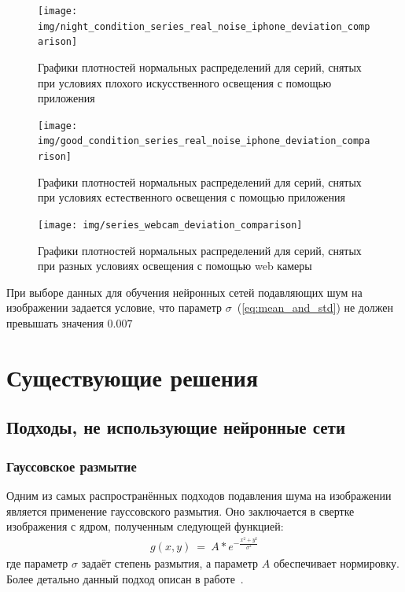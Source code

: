 \begin{figure}[H]
	\centering
	\texttt{[image: img/night\_condition\_series\_real\_noise\_iphone\_deviation\_comparison]}
	\caption{Графики плотностей нормальных распределений для серий, снятых при условиях плохого искусственного освещения с помощью приложения~\autocite{RAWCamera}}
	\label{fig:distribuion_real_noise}
\end{figure}


\begin{figure}[H]
	\centering
	\texttt{[image: img/good\_condition\_series\_real\_noise\_iphone\_deviation\_comparison]}
	\caption{Графики плотностей нормальных распределений для серий, снятых при условиях естественного освещения с помощью приложения~\autocite{RAWCamera}}
	\label{fig:distribuion_real_noise_good_condition}
\end{figure}

\begin{figure}[H]
	\centering
	\texttt{[image: img/series\_webcam\_deviation\_comparison]}
	\caption{Графики плотностей нормальных распределений для серий, снятых при разных условиях освещения с помощью web камеры~\autocite{WebCam}}
	\label{fig:distribuion_webcam}
\end{figure}


При выборе данных для обучения нейронных сетей подавляющих шум на изображении задается условие, что параметр $\sigma$~(\ref{eq:mean_and_std}) не должен превышать значения $0.007$

\section{Существующие решения}
\subsection{Подходы, не использующие нейронные сети}

\subsubsection{Гауссовское размытие}
Одним из самых распространённых подходов подавления шума на изображении является применение гауссовского размытия. Оно заключается в свертке изображения с ядром, полученным следующей функцией:
\begin{eqnarray}\label{eq:gauss_kernel_function}
g(x, y)\ =\ A \ast e^{-\frac{x^2 + y^2}{\sigma^2}}
\end{eqnarray}
где параметр $\sigma$ задаёт степень размытия, а параметр $A$ обеспечивает нормировку. Более детально данный подход описан в работе~\autocite{GaussianBilinear}.

